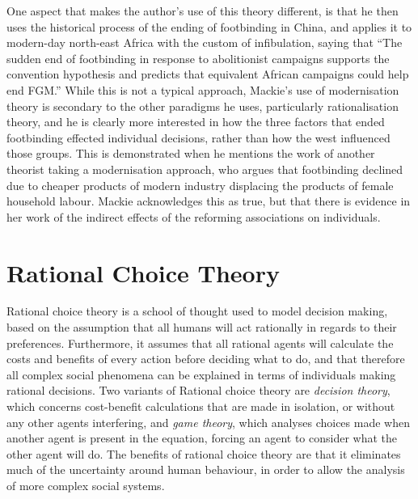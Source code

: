 \documentclass[twoside, 11pt]{article}
\begin{document}
	One aspect that makes the author's use of this theory different, is that he then uses the historical process of the ending of footbinding in China, and applies it to modern-day north-east Africa with the custom of infibulation, saying that ``The sudden end of footbinding in response to abolitionist campaigns supports the convention hypothesis and predicts that equivalent African campaigns could help end FGM.'' \cite[p.1015]{Mackie1996} While this is not a typical approach, Mackie's use of modernisation theory is secondary to the other paradigms he uses, particularly rationalisation theory, and he is clearly more interested in how the three factors that ended footbinding effected individual decisions, rather than how the west influenced those groups. This is demonstrated when he mentions the work of another theorist taking a modernisation approach, who argues that footbinding declined due to cheaper products of modern industry displacing the products of female household labour. Mackie acknowledges this as true, but that there is evidence in her work of the indirect effects of the reforming associations on individuals. \cite[p.1014]{Mackie1996}

\section*{Rational Choice Theory}
	Rational choice theory is a school of thought used to model decision making, based on the assumption that all humans will act rationally in regards to their preferences. Furthermore, it assumes that all rational agents will calculate the costs and benefits of every action before deciding what to do, and that therefore all complex social phenomena can be explained in terms of individuals making rational decisions. \cite[p.126-127]{Scott1999} Two variants of Rational choice theory are \textit{decision theory}, which concerns cost-benefit calculations that are made in isolation, or without any other agents interfering, and \textit{game theory}, which analyses choices made when another agent is present in the equation, forcing an agent to consider what the other agent will do. The benefits of rational choice theory are that it eliminates much of the uncertainty around human behaviour, in order to allow the analysis of more complex social systems. \cite[pp.131-133]{Scott1999}
\end{document}
